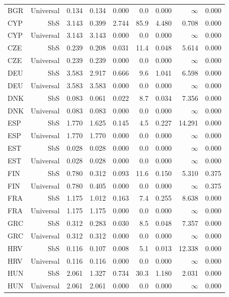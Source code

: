 {\begin{longtable}{@{}lrrrrrrrr@{}}
BGR & Universal & 0.134 & 0.134 & 0.000 &  0.0 & 0.000 & $\infty$ & 0.000 \\
CYP & SbS & 3.143 & 0.399 & 2.744 & 85.9 & 4.480 &  0.708 & 0.000 \\
CYP & Universal & 3.143 & 3.143 & 0.000 &  0.0 & 0.000 & $\infty$ & 0.000 \\
CZE & SbS & 0.239 & 0.208 & 0.031 & 11.4 & 0.048 &  5.614 & 0.000 \\
CZE & Universal & 0.239 & 0.239 & 0.000 &  0.0 & 0.000 & $\infty$ & 0.000 \\
DEU & SbS & 3.583 & 2.917 & 0.666 &  9.6 & 1.041 &  6.598 & 0.000 \\
DEU & Universal & 3.583 & 3.583 & 0.000 &  0.0 & 0.000 & $\infty$ & 0.000 \\
DNK & SbS & 0.083 & 0.061 & 0.022 &  8.7 & 0.034 &  7.356 & 0.000 \\
DNK & Universal & 0.083 & 0.083 & 0.000 &  0.0 & 0.000 & $\infty$ & 0.000 \\
ESP & SbS & 1.770 & 1.625 & 0.145 &  4.5 & 0.227 & 14.291 & 0.000 \\
ESP & Universal & 1.770 & 1.770 & 0.000 &  0.0 & 0.000 & $\infty$ & 0.000 \\
EST & SbS & 0.028 & 0.028 & 0.000 &  0.0 & 0.000 & $\infty$ & 0.000 \\
EST & Universal & 0.028 & 0.028 & 0.000 &  0.0 & 0.000 & $\infty$ & 0.000 \\
FIN & SbS & 0.780 & 0.312 & 0.093 & 11.6 & 0.150 &  5.310 & 0.375 \\
FIN & Universal & 0.780 & 0.405 & 0.000 &  0.0 & 0.000 & $\infty$ & 0.375 \\
FRA & SbS & 1.175 & 1.012 & 0.163 &  7.4 & 0.255 &  8.638 & 0.000 \\
FRA & Universal & 1.175 & 1.175 & 0.000 &  0.0 & 0.000 & $\infty$ & 0.000 \\
GRC & SbS & 0.312 & 0.283 & 0.030 &  8.5 & 0.048 &  7.357 & 0.000 \\
GRC & Universal & 0.312 & 0.312 & 0.000 &  0.0 & 0.000 & $\infty$ & 0.000 \\
HRV & SbS & 0.116 & 0.107 & 0.008 &  5.1 & 0.013 & 12.338 & 0.000 \\
HRV & Universal & 0.116 & 0.116 & 0.000 &  0.0 & 0.000 & $\infty$ & 0.000 \\
HUN & SbS & 2.061 & 1.327 & 0.734 & 30.3 & 1.180 &  2.031 & 0.000 \\
HUN & Universal & 2.061 & 2.061 & 0.000 &  0.0 & 0.000 & $\infty$ & 0.000 \\

\end{longtable}}
